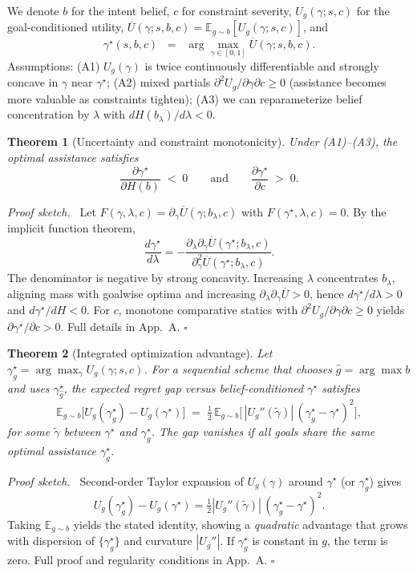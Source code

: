 \documentclass[11pt]{article}
\newtheorem{theorem}{Theorem}
\newenvironment{proofsketch}{\noindent\textit{Proof sketch.}\ }{\hfill$\square$}
\begin{document}
We denote $b$ for the intent belief, $c$ for constraint severity, $U_g(\gamma;s,c)$ for the goal-conditioned utility, $\overline U(\gamma;s,b,c)=\mathbb{E}_{g\sim b}[U_g(\gamma;s,c)]$, and
\[
\gamma^\star(s,b,c) \;\;=\;\; \arg\max_{\gamma\in[0,1]} \overline U(\gamma;s,b,c).
\]
Assumptions: (A1) $U_g(\gamma)$ is twice continuously differentiable and strongly concave in $\gamma$ near $\gamma^\star$; (A2) mixed partials $\partial^2 U_g/\partial \gamma \partial c \ge 0$ (assistance becomes more valuable as constraints tighten); (A3) we can reparameterize belief concentration by $\lambda$ with $dH(b_\lambda)/d\lambda<0$.


\begin{theorem}[Uncertainty and constraint monotonicity]
Under (A1)–(A3), the optimal assistance satisfies
\[
\frac{\partial \gamma^\star}{\partial H(b)} \;<\; 0
\qquad\text{and}\qquad
\frac{\partial \gamma^\star}{\partial c} \;>\; 0.
\]
\end{theorem}
\begin{proofsketch}
Let $F(\gamma,\lambda,c)=\partial_\gamma \overline U(\gamma; b_\lambda,c)$ with $F(\gamma^\star,\lambda,c)=0$. By the implicit function theorem,
\[
\frac{d\gamma^\star}{d\lambda}
= -\frac{\partial_{\lambda}\partial_{\gamma}\overline U(\gamma^\star; b_\lambda,c)}
{\partial_{\gamma}^2 \overline U(\gamma^\star; b_\lambda,c)}.
\]
The denominator is negative by strong concavity. Increasing $\lambda$ concentrates $b_\lambda$, aligning mass with goalwise optima and increasing $\partial_{\lambda}\partial_{\gamma}\overline U>0$, hence $d\gamma^\star/d\lambda>0$ and $d\gamma^\star/dH<0$. For $c$, monotone comparative statics with $\partial^2 U_g/\partial\gamma\partial c\ge 0$ yields $\partial \gamma^\star/\partial c>0$. Full details in App.~A.
\end{proofsketch}

\begin{theorem}[Integrated optimization advantage]
Let $\gamma_g^\star=\arg\max_{\gamma} U_g(\gamma;s,c)$. For a sequential scheme that chooses $\hat g=\arg\max b$ and uses $\gamma_{\hat g}^\star$, the expected regret gap versus belief-conditioned $\gamma^\star$ satisfies
\[
\mathbb{E}_{g\sim b}\!\big[U_g(\gamma_g^\star)-U_g(\gamma^\star)\big]
\;=\;\tfrac{1}{2}\,\mathbb{E}_{g\sim b}\!\big[\,|U_g''(\tilde\gamma)|\,(\gamma_g^\star-\gamma^\star)^2\big],
\]
for some $\tilde\gamma$ between $\gamma^\star$ and $\gamma_g^\star$. The gap vanishes if all goals share the same optimal assistance $\gamma_g^\star$.
\end{theorem}
\begin{proofsketch}
Second-order Taylor expansion of $U_g(\gamma)$ around $\gamma^\star$ (or $\gamma_g^\star$) gives
\[
U_g(\gamma_g^\star)-U_g(\gamma^\star)
= \tfrac{1}{2} |U_g''(\tilde\gamma)|\,(\gamma_g^\star-\gamma^\star)^2.
\]
Taking $\mathbb{E}_{g\sim b}$ yields the stated identity, showing a \emph{quadratic} advantage that grows with dispersion of $\{\gamma_g^\star\}$ and curvature $|U_g''|$. If $\gamma_g^\star$ is constant in $g$, the term is zero. Full proof and regularity conditions in App.~A.
\end{proofsketch}
\end{document}
